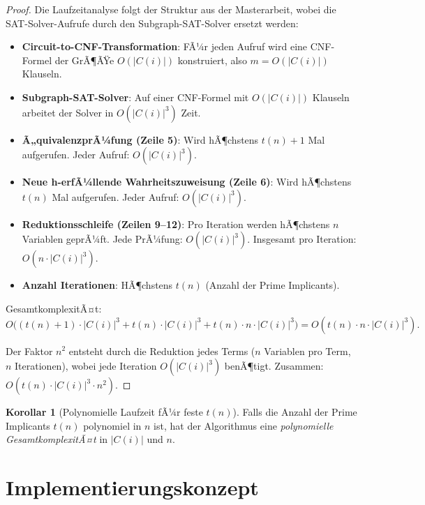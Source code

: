 ﻿\documentclass[a4paper,12pt]{article}
\theoremstyle{definition}
\newtheorem{korollar}{Korollar}
\begin{document}
\begin{proof}
    Die Laufzeitanalyse folgt der Struktur aus der Masterarbeit, wobei die SAT-Solver-Aufrufe durch den Subgraph-SAT-Solver ersetzt werden:
    
    \begin{itemize}
        \item[-] \textbf{Circuit-to-CNF-Transformation}: FÃ¼r jeden Aufruf wird eine CNF-Formel der GrÃ¶ÃŸe $O(|C(i)|)$ konstruiert, also $m = O(|C(i)|)$ Klauseln.
        \item[-] \textbf{Subgraph-SAT-Solver}: Auf einer CNF-Formel mit $O(|C(i)|)$ Klauseln arbeitet der Solver in $O(|C(i)|^3)$ Zeit.
        \item[-] \textbf{Ã„quivalenzprÃ¼fung (Zeile 5)}: Wird hÃ¶chstens $t(n) + 1$ Mal aufgerufen. Jeder Aufruf: $O(|C(i)|^3)$.
        \item[-] \textbf{Neue h-erfÃ¼llende Wahrheitszuweisung (Zeile 6)}: Wird hÃ¶chstens $t(n)$ Mal aufgerufen. Jeder Aufruf: $O(|C(i)|^3)$.
        \item[-] \textbf{Reduktionsschleife (Zeilen 9--12)}: Pro Iteration werden hÃ¶chstens $n$ Variablen geprÃ¼ft. Jede PrÃ¼fung: $O(|C(i)|^3)$. Insgesamt pro Iteration: $O(n \cdot |C(i)|^3)$.
        \item[-] \textbf{Anzahl Iterationen}: HÃ¶chstens $t(n)$ (Anzahl der Prime Implicants).
    \end{itemize}
    
    GesamtkomplexitÃ¤t:
    \[
    O\big((t(n)+1) \cdot |C(i)|^3 + t(n) \cdot |C(i)|^3 + t(n) \cdot n \cdot |C(i)|^3\big) = O(t(n) \cdot n \cdot |C(i)|^3).
    \]
    
    Der Faktor $n^2$ entsteht durch die Reduktion jedes Terms ($n$ Variablen pro Term, $n$ Iterationen), wobei jede Iteration $O(|C(i)|^3)$ benÃ¶tigt. Zusammen: $O(t(n) \cdot |C(i)|^3 \cdot n^2)$.
\end{proof}

\begin{korollar}[Polynomielle Laufzeit fÃ¼r feste $t(n)$]
    Falls die Anzahl der Prime Implicants $t(n)$ polynomiel in $n$ ist, hat der Algorithmus eine \textit{polynomielle GesamtkomplexitÃ¤t} in $|C(i)|$ und $n$.
\end{korollar}

\section{Implementierungskonzept}
\end{document}
